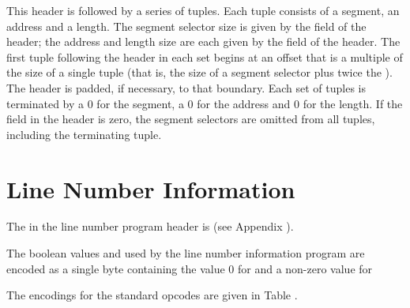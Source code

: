 This header is followed by a series of tuples. Each tuple
consists of a segment, an address and a length. 
The segment selector
size is given by the \HFNsegmentselectorsize{} field of the header; the
address and length size are each given by the 
field of the header. 
The first tuple following the header in
each set begins at an offset that is a multiple of the size
of a single tuple (that is, the size of a segment selector
plus twice the ). 
The header is padded, if
necessary, to that boundary. Each set of tuples is terminated
by a 0 for the segment, a 0 for the address and 0 for the
length. If the \HFNsegmentselectorsize{} field in the header is zero,
the segment selectors are omitted from all tuples, including
the terminating tuple.


\section{Line Number Information}
\label{datarep:linenumberinformation}

The 
in the line number program header is \versiondotdebugline{}
(see Appendix ). 

The boolean values  and  
used by the line number information program are encoded
as a single byte containing the value 0 
for  and a non-zero value for 

The encodings for the standard opcodes are given in 
Table .

